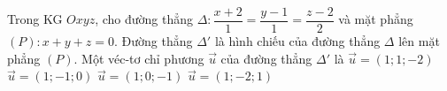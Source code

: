 \begin{ex}%
	Trong KG $Oxyz$, cho đường thẳng $\Delta: \dfrac{x + 2}{1}=\dfrac{y - 1}{1}=\dfrac{z - 2}{2}$ và mặt phẳng $(P): x + y + z=0. $ Đường thẳng ${\Delta}'$ là hình chiếu của đường thẳng $\Delta $ lên mặt phẳng $(P). $ Một véc-tơ chỉ phương $\overrightarrow{u}$ của đường thẳng ${\Delta}'$ là
	\choice
	{\True $\overrightarrow{u}=\left(1; 1; - 2\right)$}
	{$\overrightarrow{u}=\left(1; - 1; 0\right)$}
	{$\overrightarrow{u}=\left(1; 0; - 1\right)$}
	{$\overrightarrow{u}=\left(1; - 2; 1\right)$}
	\end{ex}

